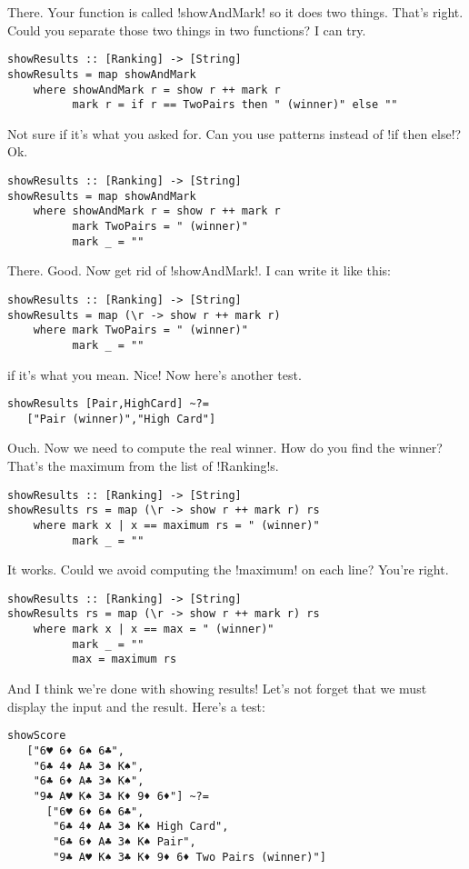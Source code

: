 \success There.
\lhN Your function is called \il!showAndMark! so it does two things.
\lhA That's right.
\lhN Could you separate those two things in two functions?
\lhA I can try.
\begin{lstlisting}[frame=single]
showResults :: [Ranking] -> [String]
showResults = map showAndMark
    where showAndMark r = show r ++ mark r
          mark r = if r == TwoPairs then " (winner)" else ""
\end{lstlisting}
\success Not sure if it's what you asked for.
\lhN Can you use patterns instead of \il!if then else!?
\lhA Ok.
\begin{lstlisting}[frame=single]
showResults :: [Ranking] -> [String]
showResults = map showAndMark
    where showAndMark r = show r ++ mark r
          mark TwoPairs = " (winner)"
          mark _ = ""
\end{lstlisting}
\success There.
\lhN Good. Now get rid of \il!showAndMark!.
\lhA I can write it like this:
\begin{lstlisting}[frame=single]
showResults :: [Ranking] -> [String]
showResults = map (\r -> show r ++ mark r)
    where mark TwoPairs = " (winner)"
          mark _ = ""
\end{lstlisting}
\success if it's what you mean.
\lhN Nice! Now here's another test.
\begin{lstlisting}[frame=single]
showResults [Pair,HighCard] ~?= 
   ["Pair (winner)","High Card"]
\end{lstlisting}
\lhA \failure Ouch. Now we need to compute the real winner.
\lhN How do you find the winner?
\lhA \failure That's the maximum from the list of \il!Ranking!s.
\begin{lstlisting}[frame=single]
showResults :: [Ranking] -> [String]
showResults rs = map (\r -> show r ++ mark r) rs
    where mark x | x == maximum rs = " (winner)"
          mark _ = ""
\end{lstlisting}
\success It works.
\lhN Could we avoid computing the \il!maximum! on each line?
\lhA You're right.
\begin{lstlisting}[frame=single]
showResults :: [Ranking] -> [String]
showResults rs = map (\r -> show r ++ mark r) rs
    where mark x | x == max = " (winner)"
          mark _ = ""
          max = maximum rs
\end{lstlisting}
\success And I think we're done with showing results!
\lhN Let's not forget that we must display the input and the result. Here's a test:
\begin{lstlisting}[frame=single]
showScore 
   ["6♥ 6♦ 6♠ 6♣",
    "6♣ 4♦ A♣ 3♠ K♠",
    "6♣ 6♦ A♣ 3♠ K♠",
    "9♣ A♥ K♠ 3♣ K♦ 9♦ 6♦"] ~?= 
      ["6♥ 6♦ 6♠ 6♣",
       "6♣ 4♦ A♣ 3♠ K♠ High Card",
       "6♣ 6♦ A♣ 3♠ K♠ Pair",
       "9♣ A♥ K♠ 3♣ K♦ 9♦ 6♦ Two Pairs (winner)"]
\end{lstlisting}
